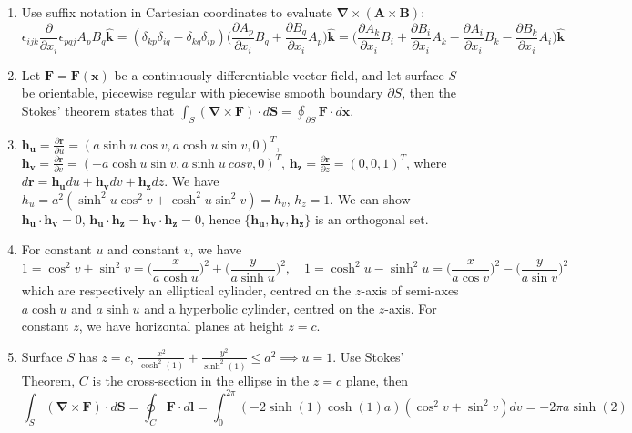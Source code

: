 \documentclass[a4paper]{article}
\begin{document}
\begin{ans}\leavevmode
\begin{enumerate}[label=(\alph*)]
    \item Use suffix notation in Cartesian coordinates to evaluate $\boldsymbol{\nabla}\times(\mathbf{A}\times\mathbf{B})$:
$$\epsilon_{ijk}\frac{\partial}{\partial x_i}\epsilon_{pqj}A_pB_q\mathbf{\hat{k}}=(\delta_{kp}\delta_{iq}-\delta_{kq}\delta_{ip})\bigg(\frac{\partial A_p}{\partial x_i}B_q+\frac{\partial B_q}{\partial x_i}A_p\bigg)\mathbf{\hat{k}}=\bigg(\frac{\partial A_k}{\partial x_i}B_i+\frac{\partial B_i}{\partial x_i}A_k-\frac{\partial A_i}{\partial x_i}B_k-\frac{\partial B_k}{\partial x_i}A_i\bigg)\mathbf{\hat{k}}$$
\item Let $\mathbf{F}=\mathbf{F}(\mathbf{x})$ be a continuously differentiable vector field, and let surface $S$ be orientable, piecewise regular with piecewise smooth boundary $\partial S$, then the Stokes' theorem states that $\int_S(\boldsymbol{\nabla}\times\mathbf{F})\cdot d\mathbf{S}=\oint_{\partial S}\mathbf{F}\cdot d\mathbf{x}$.
\item $\mathbf{h_u}=\frac{\partial\mathbf{r}}{\partial u}=(a\sinh u\cos v,a\cosh u\sin v,0)^T$, $\mathbf{h_v}=\frac{\partial\mathbf{r}}{\partial v}=(-a\cosh u\sin v,a\sinh u\ cos v,0)^T$, $\mathbf{h_z}=\frac{\partial\mathbf{r}}{\partial z}=(0,0,1)^T$, where $d\mathbf{r}=\mathbf{h_u}du+\mathbf{h_v}dv+\mathbf{h_z}dz$. We have $h_u=a^2(\sinh^2u\cos^2v+\cosh^2u\sin^2v)=h_v$, $h_z=1$. We can show $\mathbf{h_u}\cdot\mathbf{h_v}=0$, $\mathbf{h_u}\cdot\mathbf{h_z}=\mathbf{h_v}\cdot\mathbf{h_z}=0$, hence $\{\mathbf{h_u},\mathbf{h_v},\mathbf{h_z}\}$ is an orthogonal set.
\item For constant $u$ and constant $v$, we have
$$1=\cos^2v+\sin^2v=\bigg(\frac{x}{a\cosh u}\bigg)^2+\bigg(\frac{y}{a\sinh u}\bigg)^2,\quad 1=\cosh^2u-\sinh^2u=\bigg(\frac{x}{a\cos v}\bigg)^2-\bigg(\frac{y}{a\sin v}\bigg)^2$$
which are respectively an elliptical cylinder, centred on the $z$-axis of semi-axes $a\cosh u$ and $a\sinh u$ and a hyperbolic cylinder, centred on the $z$-axis. For constant $z$, we have horizontal planes at height $z=c$.
\item Surface $S$ has $z=c$, $\frac{x^2}{\cosh^2(1)}+\frac{y^2}{\sinh^2(1)}\leq a^2\implies u=1$. Use Stokes' Theorem, $C$ is the cross-section in the ellipse in the $z=c$ plane, then
$$\int_S(\boldsymbol{\nabla}\times\mathbf{F})\cdot d\mathbf{S}=\oint_C\mathbf{F}\cdot d\mathbf{l}=\int_0^{2\pi}(-2\sinh(1)\cosh(1)a)(\cos^2v+\sin^2v)dv=-2\pi a \sinh(2)$$
\end{enumerate}
\end{ans}
\end{document}
